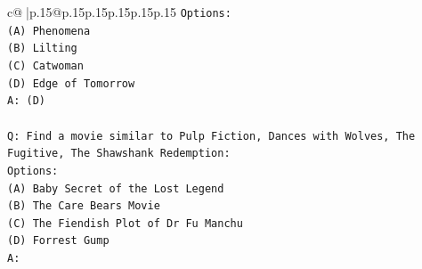 \documentclass{article}
\begin{document}
{\begin{supertabular}{c@{$\;$}|p{.15\linewidth}@{}p{.15\linewidth}p{.15\linewidth}p{.15\linewidth}p{.15\linewidth}p{.15\linewidth}}
{{{\texttt{Options:} \\
\texttt{(A) Phenomena} \\
\texttt{(B) Lilting} \\
\texttt{(C) Catwoman} \\
\texttt{(D) Edge of Tomorrow} \\
\texttt{A: (D)} \\
\\ 
\texttt{Q: Find a movie similar to Pulp Fiction, Dances with Wolves, The Fugitive, The Shawshank Redemption:} \\
\texttt{Options:} \\
\texttt{(A) Baby Secret of the Lost Legend} \\
\texttt{(B) The Care Bears Movie} \\
\texttt{(C) The Fiendish Plot of Dr Fu Manchu} \\
\texttt{(D) Forrest Gump} \\
\texttt{A:} \\
            }
        }
    }
     \\ \\


\end{supertabular}}
\end{document}
